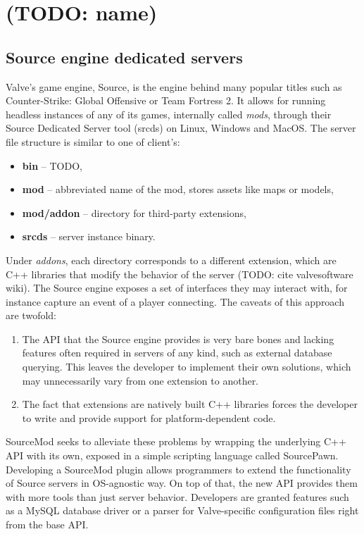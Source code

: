 \chapter{(TODO: name)}
\section{Source engine dedicated servers}

Valve's game engine, Source, is the engine behind many popular titles such as Counter-Strike: Global Offensive or Team Fortress 2.
It allows for running headless instances of any of its games, internally called \textit{mods}, through their Source Dedicated Server tool (srcds) on Linux, Windows and MacOS.
The server file structure is similar to one of client's:
\begin{itemize}
    \item \textbf{bin} -- TODO,
    \item \textbf{mod} -- abbreviated name of the mod, stores assets like maps or models,
    \item \textbf{mod/addon} -- directory for third-party extensions,
    \item \textbf{srcds} -- server instance binary.
\end{itemize}
Under \textit{addons}, each directory corresponds to a different extension, which are C++ libraries that modify the behavior of the server (TODO: cite valvesoftware wiki).
The Source engine exposes a set of interfaces they may interact with, for instance capture an event of a player connecting.
The caveats of this approach are twofold:
\begin{enumerate}
\item
The API that the Source engine provides is very bare bones and lacking features often required in servers of any kind, such as external database querying.
This leaves the developer to implement their own solutions, which may unnecessarily vary from one extension to another.
\item
The fact that extensions are natively built C++ libraries forces the developer to write and provide support for platform-dependent code.
\end{enumerate}
SourceMod seeks to alleviate these problems by wrapping the underlying C++ API with its own, exposed in a simple scripting language called SourcePawn.
Developing a SourceMod plugin allows programmers to extend the functionality of Source servers in OS-agnostic way.
On top of that, the new API provides them with more tools than just server behavior.
Developers are granted features such as a MySQL database driver or a parser for Valve-specific configuration files right from the base API.

